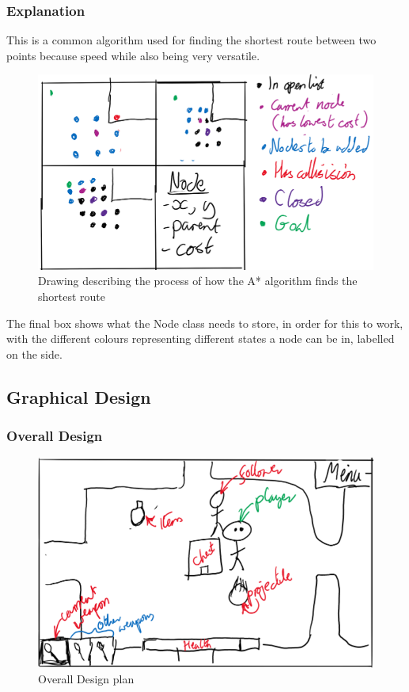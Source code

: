 \documentclass{article}
\begin{document}
            \subsubsection{Explanation}
                This is a common algorithm used for finding the shortest route between two points because speed while also being very versatile.
                \begin{figure}[hbt!]
                    \centerline{\includegraphics[scale=0.3]{img/Design/A-star algorithm.png}}
                    \caption{Drawing describing the process of how the A* algorithm finds the shortest route}
                    \label{fig}
                \end{figure}

                The final box shows what the Node class needs to store, in order for this to work, with the different colours representing different states a node can be in, labelled on the side.
        \subsection{Graphical Design}
            \subsubsection{Overall Design}
                \begin{figure}[hbt!]
                    \centerline{\includegraphics[scale=0.3]{img/Design/Overall Design.png}}
                    \caption{Overall Design plan}
                    \label{fig}
                \end{figure}
\end{document}
